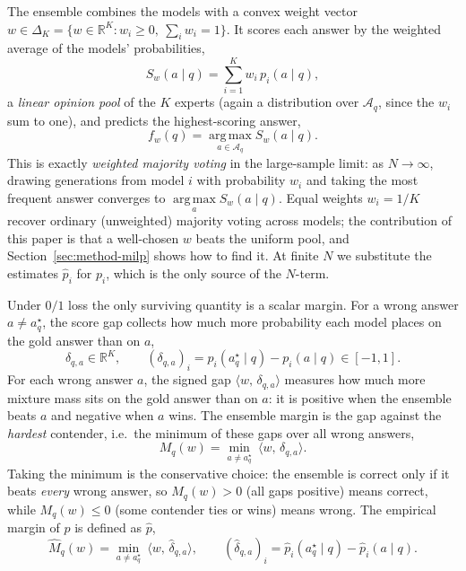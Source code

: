 \documentclass{article} %
\providecommand{\R}{\mathbb{R}}
\providecommand{\argmax}{\mathop{\mathrm{arg\,max}}\limits}
\providecommand{\Aq}{\mathcal{A}_q}
\providecommand{\simplex}{\Delta_K}
\providecommand{\ip}[2]{\langle #1,\, #2\rangle}
\providecommand{\dhat}{\widehat{\delta}}
\providecommand{\phat}{\widehat{p}}
\providecommand{\Mhat}{\widehat{M}}
\begin{document}
The ensemble combines the models with a convex weight vector
$w \in \simplex = \{w\in\R^K : w_i\ge 0,\ \sum_i w_i = 1\}$. It scores each answer
by the weighted average of the models' probabilities,
\begin{equation}
\label{eq:score}
S_w(a\mid q) = \sum_{i=1}^K w_i\, p_i(a\mid q),
\end{equation}
a \emph{linear opinion pool} of the $K$ experts (again a distribution over $\Aq$,
since the $w_i$ sum to one), and predicts the highest-scoring answer,
\begin{equation}
\label{eq:predictor-notation}
f_w(q) = \argmax_{a\in\Aq} S_w(a\mid q).
\end{equation}
This is exactly \emph{weighted majority voting} in the large-sample limit: as
$N\to\infty$, drawing generations from model $i$ with probability $w_i$ and
taking the most frequent answer converges to $\argmax_a S_w(a\mid q)$. Equal
weights $w_i=1/K$ recover ordinary (unweighted) majority voting across models; the
contribution of this paper is that a well-chosen $w$ beats the uniform pool, and
Section~\ref{sec:method-milp} shows how to find it. At finite $N$ we substitute
the estimates $\phat_i$ for $p_i$, which is the only source of the $N$-term.

Under $0/1$ loss the only surviving quantity is a scalar margin. For a wrong
answer $a\ne a_q^\star$, the score gap collects how much more probability each
model places on the gold answer than on $a$,
\begin{equation}
\label{eq:delta}
\delta_{q,a}\in\R^K,
\qquad
(\delta_{q,a})_i = p_i(a_q^\star\mid q) - p_i(a\mid q) \in [-1,1].
\end{equation}
For each wrong answer $a$, the signed gap $\ip{w}{\delta_{q,a}}$ measures how
much more mixture mass sits on the gold answer than on $a$: it is positive when
the ensemble beats $a$ and negative when $a$ wins. The ensemble margin is the
gap against the \emph{hardest} contender, i.e.\ the minimum of these gaps over
all wrong answers,
\begin{equation}
\label{eq:M}
M_q(w) = \min_{a\ne a_q^\star}\ \ip{w}{\delta_{q,a}}.
\end{equation}
Taking the minimum is the conservative choice: the ensemble is correct only if
it beats \emph{every} wrong answer, so $M_q(w)>0$ (all gaps positive) means
correct, while $M_q(w)\le 0$ (some contender ties or wins) means wrong. The empirical margin of $p$ is defined as $\phat$,
\begin{equation}
\label{eq:Mhat}
\Mhat_q(w) = \min_{a\ne a_q^\star}\ \ip{w}{\dhat_{q,a}},
\qquad
(\dhat_{q,a})_i = \phat_i(a_q^\star\mid q) - \phat_i(a\mid q).
\end{equation}
\end{document}
